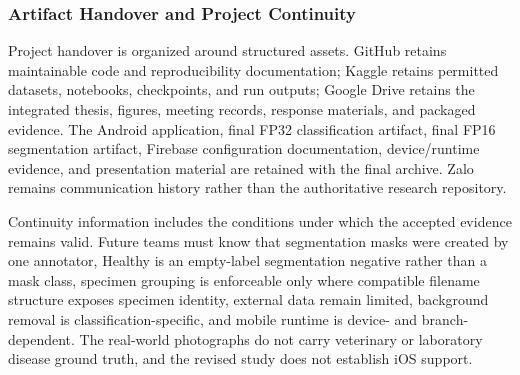 \documentclass[12pt,a4paper]{report}
\newenvironment{revisionblock}{\begin{snugshade}\noindent}{\end{snugshade}}
\begin{document}
\subsubsection{\texorpdfstring{\colorbox{RevisionYellow}{Artifact Handover and Project Continuity}}{Artifact Handover and Project Continuity}}
\begin{revisionblock}
Project handover is organized around structured assets. GitHub retains maintainable code and reproducibility documentation; Kaggle retains permitted datasets, notebooks, checkpoints, and run outputs; Google Drive retains the integrated thesis, figures, meeting records, response materials, and packaged evidence. The Android application, final FP32 classification artifact, final FP16 segmentation artifact, Firebase configuration documentation, device/runtime evidence, and presentation material are retained with the final archive. Zalo remains communication history rather than the authoritative research repository.
\end{revisionblock}
\begin{revisionblock}
Continuity information includes the conditions under which the accepted evidence remains valid. Future teams must know that segmentation masks were created by one annotator, Healthy is an empty-label segmentation negative rather than a mask class, specimen grouping is enforceable only where compatible filename structure exposes specimen identity, external data remain limited, background removal is classification-specific, and mobile runtime is device- and branch-dependent. The real-world photographs do not carry veterinary or laboratory disease ground truth, and the revised study does not establish iOS support.
\end{revisionblock}
\end{document}
